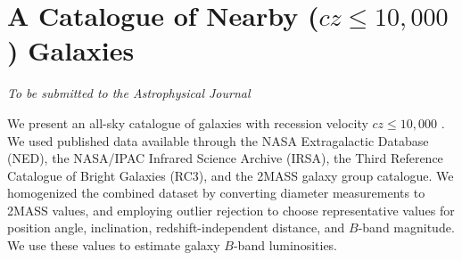 \chapter[A Catalogue of Nearby ($cz \leq 10,000$ \kms) Galaxies]{A Catalogue of Nearby ($cz \leq 10,000$ \kms) Galaxies} 
\label{chap:chap2}


\vfill

\begin{flushright}
  \fixspacing %
  \textit{To be submitted to the \emph{Astrophysical Journal}} \\
\end{flushright}

\vspace*{1in} %

\cleardoublepage


%
%
%
%
%
%
%
%
%
%
%
%
%
%


\begin{chabstract}
We present an all-sky catalogue of galaxies with recession velocity $cz \leq 10,000$ \kms. We used published data available through the NASA Extragalactic Database (NED), the NASA/IPAC Infrared Science Archive (IRSA), the Third Reference Catalogue of Bright Galaxies (RC3), and the \cite{tully2015} 2MASS galaxy group catalogue. We homogenized the combined dataset by converting diameter measurements to 2MASS values, and employing outlier rejection to choose representative values for position angle, inclination, redshift-independent distance, and $B$-band magnitude. We use these values to estimate galaxy $B$-band luminosities.


\end{chabstract}

